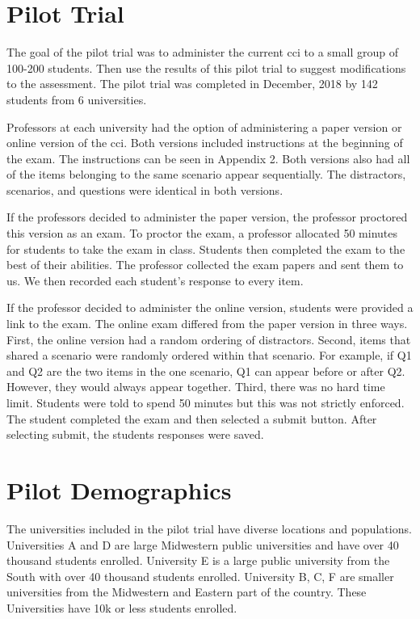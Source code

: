 \FloatBarrier






\section{Pilot Trial}

The goal of the pilot trial was to administer the current \gls{cci} to a small group of 100-200 students. Then use the results of this pilot trial to suggest modifications to the assessment. The pilot trial was completed in December, 2018 by 142 students from 6 universities.

Professors at each university had the option of administering a paper version or online version of the \gls{cci}. Both versions included instructions at the beginning of the exam. \iflong The instructions can be seen in Appendix 2. \fi Both versions also had all of the items belonging to the same scenario appear sequentially. The distractors, scenarios, and questions were identical in both versions. 

If the professors decided to administer the paper version, the professor proctored this version as an exam. To proctor the exam, a professor allocated 50 minutes for students to take the exam in class. Students then completed the exam to the best of their abilities. The professor collected the exam papers and sent them to us. We then recorded each student's response to every item. 

If the professor decided to administer the online version, students were provided a link to the exam. The online exam differed from the paper version in three ways. First, the online version had a random ordering of distractors. Second, items that shared a scenario were randomly ordered within that scenario. For example, if Q1 and Q2 are the two items in the one scenario, Q1 can appear before or after Q2. However, they would always appear together. Third, there was no hard time limit. Students were told to spend 50 minutes but this was not strictly enforced. The student completed the exam and then selected a submit button. After selecting submit, the students responses were saved.


\FloatBarrier
\section{Pilot Demographics}

The universities included in the pilot trial have diverse locations and populations. Universities A and D are large Midwestern public universities and have over 40 thousand students enrolled. University E is a large public university from the South with over 40 thousand students enrolled. University B, C, F are smaller universities from the Midwestern and Eastern part of the country. These Universities have 10k or less students enrolled.

